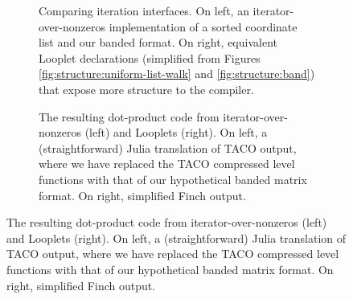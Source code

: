 \begin{figure}
    \center
    \begin{subfigure}[t]{\linewidth}
      \begin{minipage}[t]{0.5\linewidth-2pt}
      
      \end{minipage}\hspace{4pt}%
      \begin{minipage}[t]{0.5\linewidth-2pt}
      
      \end{minipage}
      \begin{minipage}[t]{0.5\linewidth-2pt}
      
      \end{minipage}\hspace{4pt}%
      \begin{minipage}[t]{0.5\linewidth-2pt}
      
      \end{minipage}
      \caption{Comparing iteration interfaces. On left, an iterator-over-nonzeros
      implementation of a sorted coordinate list and our banded format. On right,
      equivalent Looplet declarations (simplified from Figures
      \ref{fig:structure:uniform-list-walk} and \ref{fig:structure:band}) that
      expose more structure to the compiler.}\label{fig:dot-comp:protocols}
    \end{subfigure}
  
    \begin{subfigure}[t]{\linewidth}
      \begin{minipage}[t]{0.5\linewidth-2pt}
        
      \end{minipage}\hspace{4pt}%
      \begin{minipage}[t]{0.5\linewidth-2pt}
        
      \end{minipage}
      \caption{The resulting dot-product code from iterator-over-nonzeros (left)
      and Looplets (right). On left, a (straightforward) Julia translation of TACO
      output, where we have replaced the TACO compressed level functions with that
      of our hypothetical banded matrix format.  On right, simplified Finch
      output. }\label{fig:dot-comp:dot}
    \end{subfigure}
  

\end{figure}

